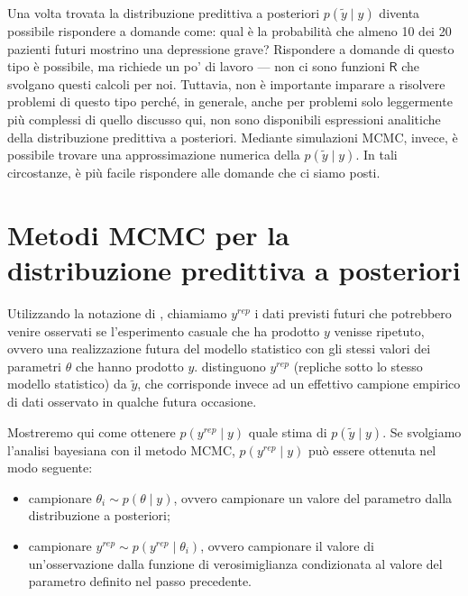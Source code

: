 \documentclass[
  11pt,
  italian,
  a4paper,
  extrafontsizes,onecolumn,openright
  ]{memoir}
\providecommand{\tightlist}{%
  \setlength{\itemsep}{0pt}\setlength{\parskip}{0pt}}
\newcommand{\R}{\textsf{R}} %
\theoremstyle{definition}
\theoremstyle{definition}
\theoremstyle{definition}
\theoremstyle{definition}
\theoremstyle{remark}
\begin{document}
Una volta trovata la distribuzione predittiva a posteriori \(p(\tilde{y} \mid y)\) diventa possibile rispondere a domande come: qual è la probabilità che almeno 10 dei 20 pazienti futuri mostrino una depressione grave? Rispondere a domande di questo tipo è possibile, ma richiede un po' di lavoro --- non ci sono funzioni \(\R\) che svolgano questi calcoli per noi. Tuttavia, non è importante imparare a risolvere problemi di questo tipo perché, in generale, anche per problemi solo leggermente più complessi di quello discusso qui, non sono disponibili espressioni analitiche della distribuzione predittiva a posteriori. Mediante simulazioni MCMC, invece, è possibile trovare una approssimazione numerica della \(p(\tilde{y} \mid y)\). In tali circostanze, è più facile rispondere alle domande che ci siamo posti.

\hypertarget{metodi-mcmc-per-la-distribuzione-predittiva-a-posteriori}{%
\section{Metodi MCMC per la distribuzione predittiva a posteriori}\label{metodi-mcmc-per-la-distribuzione-predittiva-a-posteriori}}

Utilizzando la notazione di \textcite{gelman2014understanding}, chiamiamo \(y^{rep}\) i dati previsti futuri che potrebbero venire osservati se l'esperimento casuale che ha prodotto \(y\) venisse ripetuto, ovvero una realizzazione futura del modello statistico con gli stessi valori dei parametri \(\theta\) che hanno prodotto \(y\). \textcite{gelman2014understanding} distinguono \(y^{rep}\) (repliche sotto lo stesso modello statistico) da \(\tilde{y}\), che corrisponde invece ad un effettivo campione empirico di dati osservato in qualche futura occasione.

Mostreremo qui come ottenere \(p(y^{rep} \mid y)\) quale stima di \(p(\tilde{y} \mid y)\). Se svolgiamo l'analisi bayesiana con il metodo MCMC, \(p(y^{rep} \mid y)\) può essere ottenuta nel modo seguente:

\begin{itemize}
\tightlist
\item
  campionare \(\theta_i \sim p(\theta \mid y)\), ovvero campionare un valore del parametro dalla distribuzione a posteriori;
\item
  campionare \(y^{rep} \sim p(y^{rep} \mid \theta_i)\), ovvero campionare il valore di un'osservazione dalla funzione di verosimiglianza condizionata al valore del parametro definito nel passo precedente.
\end{itemize}
\end{document}
